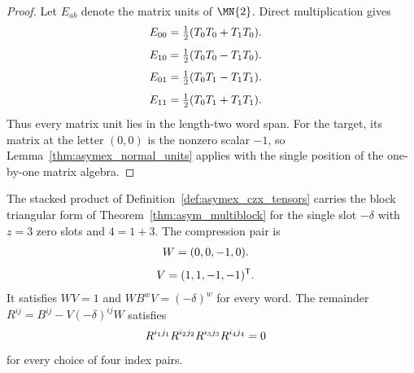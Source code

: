 \begin{proof}
    \leanok
    Let $E_{ab}$ denote the matrix units of $\MN{2}$. Direct multiplication
    gives
    \begin{align}
        E_{00} & =\tfrac12(T_0T_0+T_1T_0).
        \notag
    \end{align}
    \begin{align}
        E_{10} & =\tfrac12(T_0T_0-T_1T_0).
        \notag
    \end{align}
    \begin{align}
        E_{01} & =\tfrac12(T_0T_1-T_1T_1).
        \notag
    \end{align}
    \begin{align}
        E_{11} & =\tfrac12(T_0T_1+T_1T_1).
        \notag
    \end{align}
    Thus every matrix unit lies in the length-two word span. For the
    target, its matrix at the letter $(0,0)$ is the nonzero scalar $-1$,
    so Lemma~\ref{thm:asymex_normal_units} applies with the single
    position of the one-by-one matrix algebra.
\end{proof}

\begin{lemma}
    \label{thm:asymex_czx_compression}
    \leanok
    The stacked product of Definition~\ref{def:asymex_czx_tensors} carries
    the block triangular form of Theorem~\ref{thm:asym_multiblock} for the
    single slot $-\delta$ with $z=3$ zero slots and $4=1+3$. The
    compression pair is
    \begin{align}
        W & =(0,0,-1,0).
        \notag
    \end{align}
    \begin{align}
        V & =(1,1,-1,-1)^{\mathsf T}.
        \notag
    \end{align}
    It satisfies $WV=1$ and $WB^wV=(-\delta)^w$ for every word.
    The remainder $R^{ij}=B^{ij}-V(-\delta)^{ij}W$ satisfies
    \begin{align}
        R^{i_1j_1}R^{i_2j_2}R^{i_3j_3}R^{i_4j_4} & =0
        \notag
    \end{align}
    for every choice of four index pairs.
\end{lemma}

